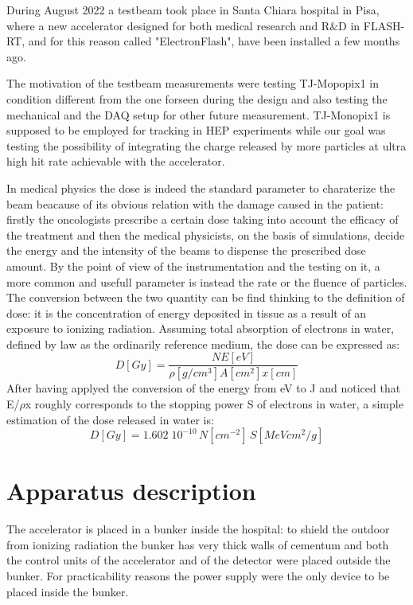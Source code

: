 
During August 2022 a testbeam took place in Santa Chiara hospital in Pisa, where a new accelerator designed for both medical research and R$\&$D in FLASH-RT, and for this reason called "ElectronFlash", have been installed a few months ago. 

The motivation of the testbeam measurements were testing TJ-Mopopix1 in condition different from the one forseen during the design and also testing the mechanical and the DAQ setup for other future measurement. TJ-Monopix1 is supposed to be employed for tracking in HEP experiments while our goal was testing the possibility of integrating the charge released by more particles at ultra high hit rate achievable with the accelerator.

In medical physics the dose is indeed the standard parameter to charaterize the beam beacause of its obvious relation with the damage caused in the patient: firstly the oncologists prescribe a certain dose taking into account the efficacy of the treatment and then the medical physicists, on the basis of simulations, decide the energy and the intensity of the beams to dispense the prescribed dose amount.
By the point of view of the instrumentation and the testing on it, a more common and usefull parameter is instead the rate or the fluence of particles.  
The conversion between the two quantity can be find thinking to the definition of dose: it is the concentration of energy deposited in tissue as a result of an exposure to ionizing radiation. 
Assuming total absorption of electrons in water, defined by law as the ordinarily reference medium, the dose can be expressed as: 
\begin{equation}
   D[Gy] = \frac{N E[eV]}{\rho[g/cm^3] A[cm^2] x[cm]}
\end{equation}
After having applyed the conversion of the energy from \si{eV} to \si{J} and noticed that E/$\rho$x roughly corresponds to the stopping power S of electrons in water, a simple estimation of the dose released in water is:
\begin{equation}
   D[Gy] = 1.602\;10^{-10}\,N[cm^{-2}]\,S[MeV cm^2/g]
\end{equation}


\section{Apparatus description}
   The accelerator is placed in a bunker inside the hospital: to shield the outdoor from ionizing radiation the bunker has very thick walls of cementum and both the control units of the accelerator and of the detector were placed outside the bunker. 
   For practicability reasons the power supply were the only device to be placed inside the bunker. 
